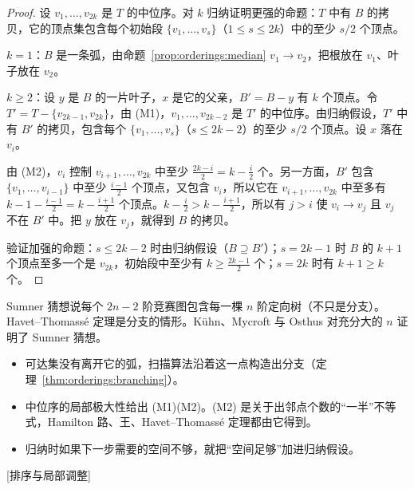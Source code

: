 \begin{proof}
设 $v_1,\dots,v_{2k}$ 是 $T$ 的中位序。对 $k$ 归纳证明更强的命题：$T$ 中有 $B$ 的拷贝，它的顶点集包含每个初始段 $\{v_1,\dots,v_s\}$（$1\leqslant s\leqslant2k$）中的至少 $s/2$ 个顶点。

$k=1$：$B$ 是一条弧，由命题~\ref{prop:orderings:median} $v_1\to v_2$，把根放在 $v_1$、叶子放在 $v_2$。

$k\geqslant2$：设 $y$ 是 $B$ 的一片叶子，$x$ 是它的父亲，$B'=B-y$ 有 $k$ 个顶点。令 $T'=T-\{v_{2k-1},v_{2k}\}$，由 (M1)，$v_1,\dots,v_{2k-2}$ 是 $T'$ 的中位序。由归纳假设，$T'$ 中有 $B'$ 的拷贝，包含每个 $\{v_1,\dots,v_s\}$（$s\leqslant2k-2$）的至少 $s/2$ 个顶点。设 $x$ 落在 $v_i$。

由 (M2)，$v_i$ 控制 $v_{i+1},\dots,v_{2k}$ 中至少 $\frac{2k-i}2=k-\frac i2$ 个。另一方面，$B'$ 包含 $\{v_1,\dots,v_{i-1}\}$ 中至少 $\frac{i-1}2$ 个顶点，又包含 $v_i$，所以它在 $v_{i+1},\dots,v_{2k}$ 中至多有 $k-1-\frac{i-1}2=k-\frac{i+1}2$ 个顶点。$k-\frac i2>k-\frac{i+1}2$，所以有 $j>i$ 使 $v_i\to v_j$ 且 $v_j$ 不在 $B'$ 中。把 $y$ 放在 $v_j$，就得到 $B$ 的拷贝。

验证加强的命题：$s\leqslant2k-2$ 时由归纳假设（$B\supseteq B'$）；$s=2k-1$ 时 $B$ 的 $k+1$ 个顶点至多一个是 $v_{2k}$，初始段中至少有 $k\geqslant\frac{2k-1}2$ 个；$s=2k$ 时有 $k+1\geqslant k$ 个。
\end{proof}

\begin{remark}
Sumner 猜想说每个 $2n-2$ 阶竞赛图包含每一棵 $n$ 阶定向树（不只是分支）。Havet--Thomassé 定理是分支的情形。Kühn、Mycroft 与 Osthus 对充分大的 $n$ 证明了 Sumner 猜想。
\end{remark}


\begin{itemize}
\item 可达集没有离开它的弧，扫描算法沿着这一点构造出分支（定理~\ref{thm:orderings:branching}）。
\item 中位序的局部极大性给出 (M1)(M2)。(M2) 是关于出邻点个数的“一半”不等式，Hamilton 路、王、Havet--Thomassé 定理都由它得到。
\item 归纳时如果下一步需要的空间不够，就把“空间足够”加进归纳假设。
\end{itemize}

[排序与局部调整]



